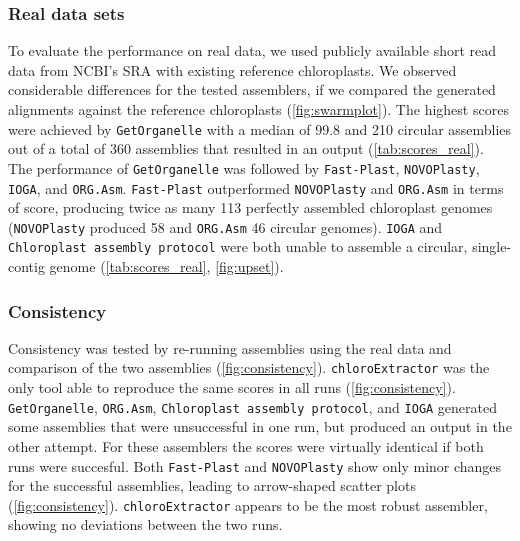 \documentclass{bmcart}
\newcommand{\todo}[1]{\textcolor{red}{\bfseries(ToDO: #1})}
\newcommand{\formatprogramnames}[1]{\texttt{#1}}
\newcommand{\ce}{\formatprogramnames{chloroExtractor}}
\newcommand{\oa}{\formatprogramnames{ORG.Asm}}
\newcommand{\fp}{\formatprogramnames{Fast-Plast}}
\newcommand{\ioga}{\formatprogramnames{IOGA}}
\newcommand{\np}{\formatprogramnames{NOVOPlasty}}
\newcommand{\go}{\formatprogramnames{GetOrganelle}}
\newcommand{\cassp}{\formatprogramnames{Chloroplast assembly protocol}}
\begin{document}
\subsubsection*{Real data sets}
To evaluate the performance on real data, we used publicly available short read data from NCBI's SRA with existing reference chloroplasts.
We observed considerable differences for the tested assemblers, if we compared the generated alignments against the reference chloroplasts (\cref{fig:swarmplot}).
The highest scores were achieved by \go{} with a median of \num{99.8} and \num{210} circular assemblies out of a total of 360 assemblies that resulted in an output (\cref{tab:scores_real}).
The performance of \go{} was followed by \fp{}, \np{}, \ioga{}, and \oa{}.
\fp{} outperformed \np{} and \oa{} in terms of score, producing twice as many \num{113} perfectly assembled chloroplast genomes (\np{} produced \num{58} and \oa{} \num{46} circular genomes).
\ioga{} and \cassp{} were both unable to assemble a circular, single-contig genome (\cref{tab:scores_real}, \cref{fig:upset}).

\subsubsection*{Consistency}
Consistency was tested by re-running assemblies using the real data and comparison of the two assemblies (\cref{fig:consistency}).
\ce{} was the only tool able to reproduce the same scores in all runs (\cref{fig:consistency}).
\go{}, \oa{}, \cassp{}, and \ioga{} generated some assemblies that were unsuccessful in one run, but produced an output in the other attempt.
For these assemblers the scores were virtually identical if both runs were succesful. %
Both \fp{} and \np{} show only minor changes for the successful assemblies, leading to arrow-shaped scatter plots (\cref{fig:consistency}).
\ce{} appears to be the most robust assembler, showing no deviations between the two runs.
\end{document}

